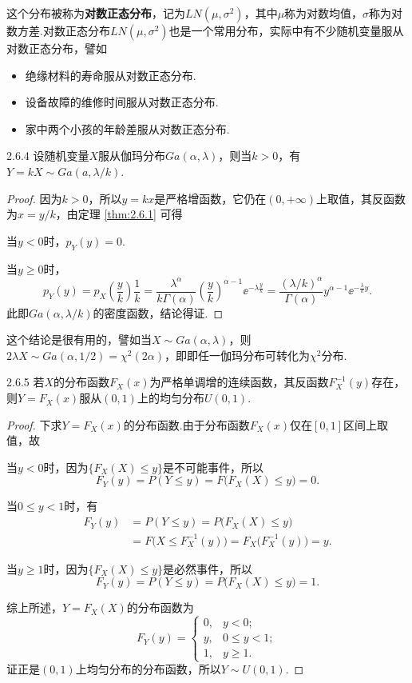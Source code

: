 这个分布被称为\textbf{对数正态分布}，记为$LN(\mu,\sigma^2)$，其中$\mu$称为对数均值，$\sigma$称为对数方差.对数正态分布$LN(\mu,\sigma^2)$也是一个常用分布，实际中有不少随机变量服从对数正态分布，譬如

\begin{itemize}
  \item 绝缘材料的寿命服从对数正态分布.

  \item 设备故障的维修时间服从对数正态分布.

  \item 家中两个小孩的年龄差服从对数正态分布.
\end{itemize}

\begin{theorem}{}{2.6.4}
  设随机变量$X$服从伽玛分布$Ga(\alpha,\lambda)$，则当$k>0$，有$Y=kX\sim Ga(a,\lambda/k)$.
\end{theorem}

\begin{proof}
  因为$k>0$，所以$y=kx$是严格增函数，它仍在$(0,+\infty)$上取值，其反函数为$x=y/k$，由定理 \ref{thm:2.6.1} 可得

  当$y<0$时，$p_Y(y)=0$.

  当$y\ge0$时，
  \[
    p_Y(y) = p_X\left( \frac yk \right)\frac1k = \frac{\lambda^\alpha}{k\Gamma(\alpha)} \left( \frac yk\right)^{\alpha-1} \ee^{-\lambda\frac yk} = \frac{(\lambda/k)^\alpha}{\Gamma(\alpha)}
    y^{\alpha-1}\ee^{-\frac\lambda ky}.
  \]
  此即$Ga(\alpha,\lambda/k)$的密度函数，结论得证.
\end{proof}

这个结论是很有用的，譬如当$X\sim Ga(\alpha,\lambda)$，则$2\lambda X\sim Ga(\alpha,1/2)=\chi^2(2\alpha)$，即即任一伽玛分布可转化为$\chi^2$分布.

\begin{theorem}{}{2.6.5}
  若$X$的分布函数$F_X(x)$为严格单调增的连续函数，其反函数$F_X^{-1}(y)$存在，则$Y=F_X(x)$服从$(0,1)$上的均匀分布$U(0,1)$.
\end{theorem}
\begin{proof}
  下求$Y=F_X(x)$的分布函数.由于分布函数$F_X(x)$仅在$[0,1]$区间上取值，故

  当$y<0$时，因为$\{F_X(X)\le y\}$是不可能事件，所以
  \[
    F_Y(y) = P(Y \le y) = F\big( F_X (X) \le y \big) = 0.
  \]

  当$0\le y<1$时，有
  \begin{align*}
    F_Y(y) & = P(Y\le y) = P\big( F_X(X) \le y \big) \\
    & = F\big( X \le F_X^{-1}(y) \big) = F_X\big( F_X^{-1}(y) \big) = y.
  \end{align*}

  当$y\ge1$时，因为$\{F_X(X)\le y\}$是必然事件，所以
  \[
    F_Y(y) = P(Y \le y) = P\big( F_X(X) \le y \big) = 1.
  \]

  综上所述，$Y=F_X(X)$的分布函数为
  \[
    F_Y(y) = \begin{cases}
      0, & y<0; \\
      y, & 0\le y<1; \\
      1, & y\ge1.
    \end{cases}
  \]
  证正是$(0,1)$上均匀分布的分布函数，所以$Y\sim U(0,1)$.
\end{proof}

